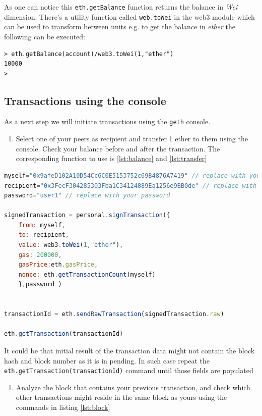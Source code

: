 \documentclass[a4paper]{article}
\begin{document}
As one can notice this \verb!eth.getBalance! function returns the balance in \emph{Wei} dimension. There's a utility function called \verb!web.toWei! in the web3 module which can be used to transform between units e.g. to get the balance in \emph{ether} the following can be executed:
\begin{verbatim}
> eth.getBalance(account)/web3.toWei(1,"ether")
10000
> 
\end{verbatim}


\subsection{Transactions using the console}

As a next step we will initiate transactions using the \verb!geth! console.

\begin{enumerate}[label=\textbf{Task \arabic*}:,l_tasks]
\item Select one of your peers as recipient and transfer 1 ether to them using the console. Check your balance before and after the transaction. The corresponding function to use is \ref{lst:balance} and \ref{lst:transfer}
\end{enumerate}

\begin{lstlisting}[language=javascript,caption={Functions to be used for signing and sending a transaction},label={lst:transfer}]
myself="0x9afeD102A10D54Cc6C0E5153752c69B4876A7419" // replace with your account
recipient="0x3FecF304285303Fba1C34124889Ea1256e9BB0de" // replace with the target account
password="user1" // replace with your password

signedTransaction = personal.signTransaction({
    from: myself,
    to: recipient,
    value: web3.toWei(1,"ether"),
    gas: 200000, 
    gasPrice:eth.gasPrice,
    nonce: eth.getTransactionCount(myself)
    },password )


transactionId = eth.sendRawTransaction(signedTransaction.raw)

eth.getTransaction(transactionId)
\end{lstlisting}

It could be that initial result of the transaction data might not contain the block hash and block number as it is in pending. In such case repeat the \verb!eth.getTransaction(transactionId)! command until those fields are populated

\begin{enumerate}[label=\textbf{Task \arabic*}:,l_tasks]
\item Analyze the block that contains your previous transaction, and check which other transactions might reside in the same block as yours using the commands in listing \ref{lst:block}
\end{enumerate}
\end{document}
